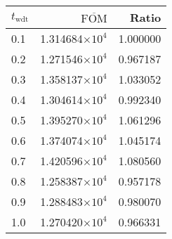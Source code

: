 \begin{tabular}{lrr}
\toprule
$t_{\mathrm{wdt}}$ & $\overline{\mathrm{FOM}}$ &    Ratio \\
\midrule
               0.1 &   1.314684$\times 10^{4}$ & 1.000000 \\
               0.2 &   1.271546$\times 10^{4}$ & 0.967187 \\
               0.3 &   1.358137$\times 10^{4}$ & 1.033052 \\
               0.4 &   1.304614$\times 10^{4}$ & 0.992340 \\
               0.5 &   1.395270$\times 10^{4}$ & 1.061296 \\
               0.6 &   1.374074$\times 10^{4}$ & 1.045174 \\
               0.7 &   1.420596$\times 10^{4}$ & 1.080560 \\
               0.8 &   1.258387$\times 10^{4}$ & 0.957178 \\
               0.9 &   1.288483$\times 10^{4}$ & 0.980070 \\
               1.0 &   1.270420$\times 10^{4}$ & 0.966331 \\
\bottomrule
\end{tabular}

